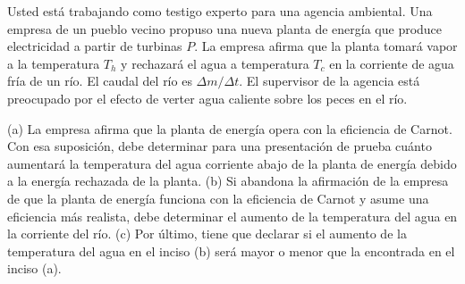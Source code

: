 \item Usted está trabajando como testigo experto para una agencia ambiental. Una empresa de un pueblo vecino propuso una nueva planta de energía que produce electricidad a partir de turbinas $P$. La empresa afirma que la planta tomará vapor a la temperatura $T_h$ y rechazará el agua a temperatura $T_c$ en la corriente de agua fría de un río. El caudal del río es $\Delta m / \Delta t$. El supervisor de la agencia está preocupado por el efecto de verter agua caliente sobre los peces en el río. 

(a) La empresa afirma que la planta de energía opera con la eficiencia de Carnot. Con esa suposición, debe determinar para una presentación de prueba cuánto aumentará la temperatura del agua corriente abajo de la planta de energía debido a la energía rechazada de la planta. 
(b) Si abandona la afirmación de la empresa de que la planta de energía funciona con la eficiencia de Carnot y asume una eficiencia más realista, debe determinar el aumento de la temperatura del agua en la corriente del río. 
(c) Por último, tiene que declarar si el aumento de la temperatura del agua en el inciso (b) será mayor o menor que la encontrada en el inciso (a).
